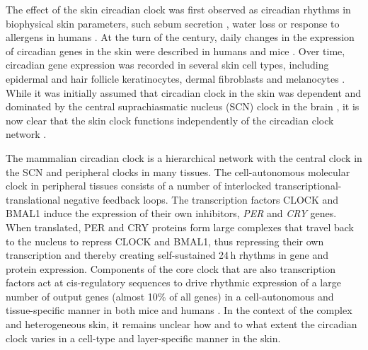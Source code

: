 The effect of the skin circadian clock was first observed as circadian rhythms in biophysical skin parameters, such sebum secretion \cite{Burton1970}, water loss \cite{Spruit1971} or response to allergens in humans \cite{Reinberg1965}. At the turn of the century, daily changes in the expression of circadian genes in the skin were described in humans \cite{Bjarnason2001} and mice \cite{Oishi2002}. Over time, circadian gene expression was recorded in several skin cell types, including epidermal and hair follicle keratinocytes, dermal fibroblasts and melanocytes \cite{Zanello2000, Kawara2002, Brown2005, Brown2008, Spoerl2011}.  While it was initially assumed that circadian clock in the skin was dependent and dominated by the central suprachiasmatic nucleus (SCN) clock in the brain \cite{Tanioka2009}, it is now clear that the skin clock functions independently of the circadian clock network \cite{Welz2019} .

The mammalian circadian clock is a hierarchical network with the central clock in the SCN and peripheral clocks in many tissues. The cell-autonomous molecular clock in peripheral tissues \cite{Takahashi2017, Dibner2010} consists of a number of interlocked transcriptional-translational negative feedback loops. The transcription factors CLOCK and BMAL1 induce the expression of their own inhibitors, \textit{PER} and \textit{CRY} genes. When translated, PER and CRY proteins form large complexes that travel back to the nucleus to repress CLOCK and BMAL1, thus repressing their own transcription and thereby creating self-sustained 24\,h rhythms in gene and protein expression. Components of the core clock that are also transcription factors act at cis-regulatory sequences to drive  rhythmic expression of a large number of output genes (almost 10\% of all genes) in a cell-autonomous and tissue-specific manner in both mice \cite{Zhang2014} and humans \cite{Ruben2018}. In the context of the complex and heterogeneous skin, it remains unclear how and to what extent the circadian clock varies in a cell-type and layer-specific manner in the skin.

